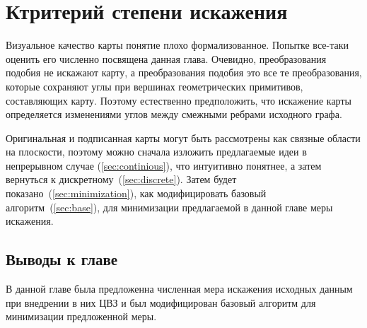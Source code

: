 \chapter{Ктритерий степени искажения}

Визуальное качество карты понятие плохо формализованное. Попытке все-таки оценить его численно посвящена данная
глава. Очевидно, преобразования подобия не искажают карту, а преобразования подобия это все те преобразования, 
которые сохраняют углы при вершинах геометрических 
примитивов, составляющих карту. Поэтому естественно предположить, что искажение карты определяется изменениями
углов между смежными ребрами исходного графа.

Оригинальная и подписанная карты могут быть рассмотрены как связные области на плоскости, поэтому можно сначала
изложить предлагаемые идеи в непрерывном случае (\ref{sec:continious}), что интуитивно понятнее, а затем вернуться к 
дискретному~(\ref{sec:discrete}). Затем будет показано~(\ref{sec:minimization}), как модифицировать 
базовый алгоритм~(\ref{sec:base}), для минимизации предлагаемой в данной главе меры искажения.





\section{Выводы к главе}
В данной главе была предложенна численная мера искажения исходных данным при внедрении в них ЦВЗ
и был модифицирован базовый алгоритм для минимизации предложенной меры.

